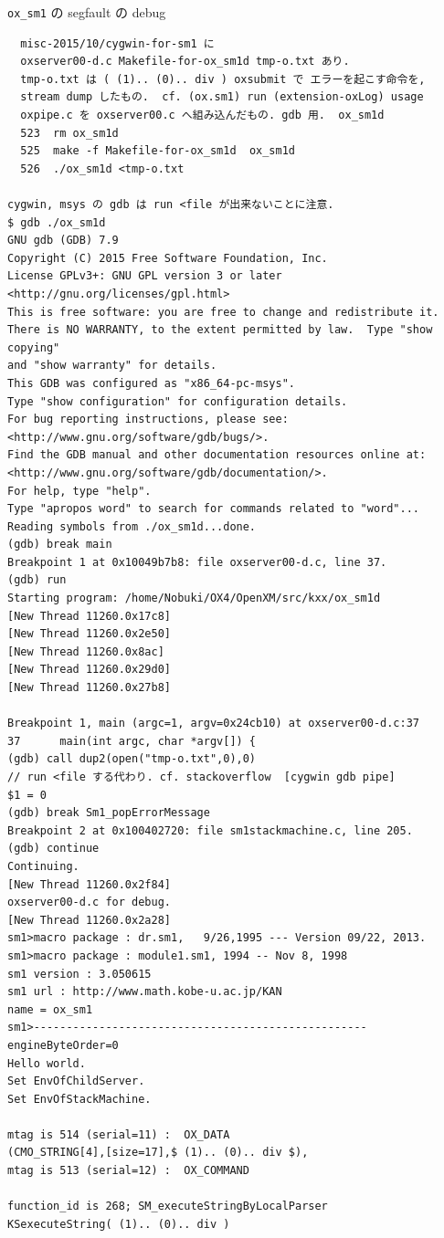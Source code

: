 \documentclass{jarticle}
\begin{document}
{\tt ox\_sm1} の segfault の debug
{\tiny
\begin{verbatim}
  misc-2015/10/cygwin-for-sm1 に
  oxserver00-d.c Makefile-for-ox_sm1d tmp-o.txt あり.
  tmp-o.txt は ( (1).. (0).. div ) oxsubmit で エラーを起こす命令を,
  stream dump したもの.  cf. (ox.sm1) run (extension-oxLog) usage
  oxpipe.c を oxserver00.c へ組み込んだもの. gdb 用.  ox_sm1d
  523  rm ox_sm1d
  525  make -f Makefile-for-ox_sm1d  ox_sm1d
  526  ./ox_sm1d <tmp-o.txt

cygwin, msys の gdb は run <file が出来ないことに注意.
$ gdb ./ox_sm1d
GNU gdb (GDB) 7.9
Copyright (C) 2015 Free Software Foundation, Inc.
License GPLv3+: GNU GPL version 3 or later <http://gnu.org/licenses/gpl.html>
This is free software: you are free to change and redistribute it.
There is NO WARRANTY, to the extent permitted by law.  Type "show copying"
and "show warranty" for details.
This GDB was configured as "x86_64-pc-msys".
Type "show configuration" for configuration details.
For bug reporting instructions, please see:
<http://www.gnu.org/software/gdb/bugs/>.
Find the GDB manual and other documentation resources online at:
<http://www.gnu.org/software/gdb/documentation/>.
For help, type "help".
Type "apropos word" to search for commands related to "word"...
Reading symbols from ./ox_sm1d...done.
(gdb) break main
Breakpoint 1 at 0x10049b7b8: file oxserver00-d.c, line 37.
(gdb) run
Starting program: /home/Nobuki/OX4/OpenXM/src/kxx/ox_sm1d
[New Thread 11260.0x17c8]
[New Thread 11260.0x2e50]
[New Thread 11260.0x8ac]
[New Thread 11260.0x29d0]
[New Thread 11260.0x27b8]

Breakpoint 1, main (argc=1, argv=0x24cb10) at oxserver00-d.c:37
37      main(int argc, char *argv[]) {
(gdb) call dup2(open("tmp-o.txt",0),0)
// run <file する代わり. cf. stackoverflow  [cygwin gdb pipe]
$1 = 0
(gdb) break Sm1_popErrorMessage
Breakpoint 2 at 0x100402720: file sm1stackmachine.c, line 205.
(gdb) continue
Continuing.
[New Thread 11260.0x2f84]
oxserver00-d.c for debug.
[New Thread 11260.0x2a28]
sm1>macro package : dr.sm1,   9/26,1995 --- Version 09/22, 2013.
sm1>macro package : module1.sm1, 1994 -- Nov 8, 1998
sm1 version : 3.050615
sm1 url : http://www.math.kobe-u.ac.jp/KAN
name = ox_sm1
sm1>---------------------------------------------------
engineByteOrder=0
Hello world.
Set EnvOfChildServer.
Set EnvOfStackMachine.

mtag is 514 (serial=11) :  OX_DATA
(CMO_STRING[4],[size=17],$ (1).. (0).. div $),
mtag is 513 (serial=12) :  OX_COMMAND

function_id is 268; SM_executeStringByLocalParser
KSexecuteString( (1).. (0).. div )


\end{verbatim}}
\end{document}
